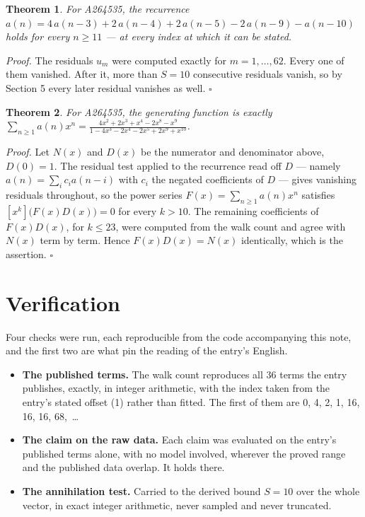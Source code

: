 \documentclass[11pt]{article}
\newtheorem{theorem}{Theorem}
\theoremstyle{definition}
\begin{document}
\begin{theorem} For A264535, the recurrence $a(n) = 4\,a(n-3) + 2\,a(n-4) + 2\,a(n-5) - 2\,a(n-9) - a(n-10)$ holds for every $n \ge 11$ --- at every index at which it can be stated.\end{theorem}

{\itshape Proof.} The residuals $u_m$ were computed exactly for $m = 1,\dots,62$. Every one of them vanished. After it, more than $S = 10$ consecutive residuals vanish, so by Section 5 every later residual vanishes as well. $\square$

\begin{theorem} For A264535, the generating function is exactly $\sum_{n\ge 1} a(n)x^n = \frac{4x^{2} + 2x^{3} + x^{4} - 2x^{8} - x^{9}}{1 - 4x^{3} - 2x^{4} - 2x^{5} + 2x^{9} + x^{10}}$.\end{theorem}

{\itshape Proof.} Let $N(x)$ and $D(x)$ be the numerator and denominator above, $D(0)=1$. The residual test applied to the recurrence read off $D$ --- namely $a(n) = \sum_i c_i a(n-i)$ with $c_i$ the negated coefficients of $D$ --- gives vanishing residuals throughout, so the power series $F(x)=\sum_{n\ge 1}a(n)x^n$ satisfies $[x^k]\bigl(F(x)D(x)\bigr) = 0$ for every $k > 10$. The remaining coefficients of $F(x)D(x)$, for $k \le 23$, were computed from the walk count and agree with $N(x)$ term by term. Hence $F(x)D(x) = N(x)$ identically, which is the assertion. $\square$

\section{Verification}

Four checks were run, each reproducible from the code accompanying this note, and the first two are what pin the reading of the entry's English.

\begin{itemize}

\item {\bfseries The published terms.} The walk count reproduces all 36 terms the entry publishes, exactly, in integer arithmetic, with the index taken from the entry's stated offset (1) rather than fitted. The first of them are 0, 4, 2, 1, 16, 16, 16, 68,~\dots

\item {\bfseries The claim on the raw data.} Each claim was evaluated on the entry's published terms alone, with no model involved, wherever the proved range and the published data overlap. It holds there.

\item {\bfseries The annihilation test.} Carried to the derived bound $S = 10$ over the whole vector, in exact integer arithmetic, never sampled and never truncated.

\end{itemize}
\end{document}
